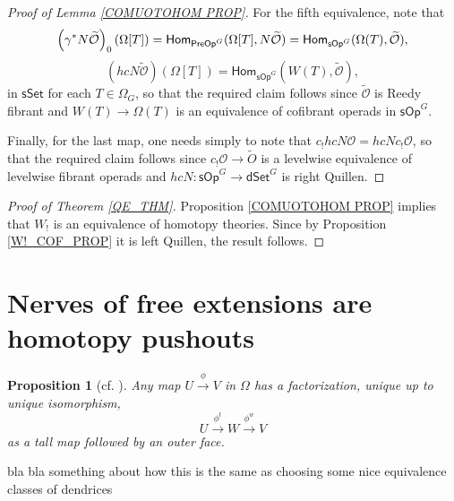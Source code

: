 \documentclass[a4paper,10pt
,draft
]{article}%
\numberwithin{equation}{section}
\numberwithin{figure}{section}
\newtheorem{proposition}[equation]{Proposition}%
\theoremstyle{definition} %
\newcommand{\sSet}{\ensuremath{\mathsf{sSet}}}%
\newcommand{\sOp}{\ensuremath{\mathsf{sOp}}}%
\newcommand{\dSet}{\mathsf{dSet}}
\DeclareMathOperator{\Aut}{Aut}%
\newcommand{\1}{\ensuremath{\mathbbm 1}}%
\begin{document}
\begin{proof}[Proof of Lemma \ref{COMUOTOHOM PROP}]
      For the fifth equivalence, note that
      \[
            \left(\gamma^{\**} N \widetilde{\mathcal{O}}\right)_0(\Omega[T]) = 
            \mathsf{Hom}_{\mathsf{PreOp}^G}(\Omega[T], N \widetilde{\mathcal{O}}) =
            \mathsf{Hom}_{\mathsf{sOp}^G}(\Omega(T),  \widetilde{\mathcal{O}}),
      \]
      \[
            \left(hcN \widetilde{\mathcal{O}} \right)(\Omega[T]) = 
            \mathsf{Hom}_{\mathsf{sOp}^G}(W(T),  \widetilde{\mathcal{O}}),
      \]
      in $\sSet$ for each $T \in \Omega_G$, %
      so that the required claim follows since 
      $\widetilde{\mathcal{O}}$ is Reedy fibrant and
      $W(T) \to \Omega(T)$ is an equivalence of cofibrant operads in $\sOp^G$. %

      Finally, for the last map, one needs simply to note that
      $c_! hcN \mathcal{O} = hcN c_! \mathcal{O}$, so that the required claim follows since 
      $c_! \mathcal{O} \to \widetilde{O}$
      is a levelwise equivalence of levelwise fibrant operads
      and $hcN: \sOp^G \to \dSet^G$ is right Quillen.
\end{proof}

\begin{proof}
      [Proof of Theorem \ref{QE_THM}]
      Proposition \ref{COMUOTOHOM PROP} implies that $W_!$ is an equivalence of homotopy theories.
      Since by Proposition \ref{W!_COF_PROP} it is left Quillen,
      the result follows.
\end{proof}







\section{Nerves of free extensions are homotopy pushouts}
\label{KEYRES SEC}


\begin{proposition}[{cf. \cite[Prop. 3.31]{BP_geo}}]
	\label{TALLOUTER_PROP}
	Any map $U \xrightarrow{\phi} V$ in $\Omega$ has a factorization, unique up to unique isomorphism,
	\[
	U \xrightarrow{\phi^t} W \xrightarrow{\phi^w} V
	\]
	as a tall map followed by an outer face.
\end{proposition}




{\color{red} bla bla something about how this is the same as choosing some nice equivalence classes of dendrices}
\end{document}
